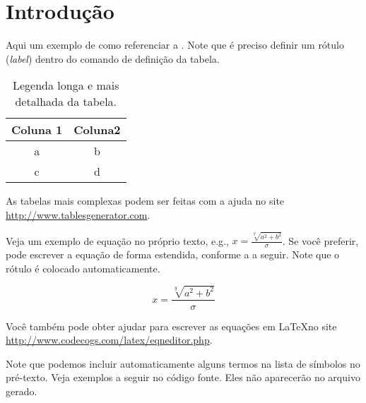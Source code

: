 \chapter{Introdução}\label{chp:Introducao}

\lipsum[1]

Aqui um exemplo de como referenciar a . Note que é preciso definir um rótulo (\textit{label}) dentro do comando de definição da tabela.

\begin{table}[!htp]
\caption[Legenda curta da tabela]{Legenda longa e mais detalhada da tabela.}
\label{tab:tabela_1}
\begin{center}
\begin{tabular}{|c|c|}
\hline
Coluna 1 & Coluna2 \\ \hline\hline
a & b \\\hline
c & d \\\hline
\end{tabular}
\end{center}
\end{table}

As tabelas mais complexas podem ser feitas com a ajuda no site \url{http://www.tablesgenerator.com}.

Veja um exemplo de equação no próprio texto, e.g., $x=\frac{\sqrt[y]{a^{2}+b^{2}}}{\sigma}$.  Se você preferir, pode escrever a equação de forma estendida, conforme a  a seguir. Note que o rótulo é colocado automaticamente.

\begin{equation}
x=\frac{\sqrt[y]{a^{2}+b^{2}}}{\sigma}
\label{eq:teste}
\end{equation}

Você também pode obter ajudar para escrever as equações em \LaTeX no site \url{http://www.codecogs.com/latex/eqneditor.php}.

Note que podemos incluir automaticamente alguns termos na lista de símbolos no pré-texto. Veja exemplos a seguir no código fonte. Eles não aparecerão no arquivo gerado. 

%
%

